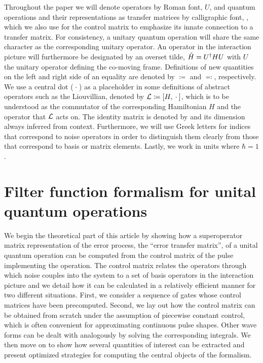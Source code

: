 Throughout the paper we will denote operators by Roman font, \eg $U$, and quantum operations and their representations as transfer matrices by calligraphic font, \eg \liouvU, which we also use for the control matrix \ctrlmat to emphasize its innate connection to a transfer matrix.
For consistency, a unitary quantum operation will share the same character as the corresponding unitary operator.
An operator in the interaction picture will furthermore be designated by an overset tilde, \eg $\tilde{H} = U^\dagger H U$ with $U$ the unitary operator defining the co-moving frame.
Definitions of new quantities on the left and right side of an equality are denoted by $\coloneqq$ and $\eqqcolon$, respectively.
We use a central dot ($\:\cdot\:$) as a placeholder in some definitions of abstract operators such as the Liouvillian, denoted by $\mc{L}\coloneqq\comm{H}{\placeholder}$, which is to be understood as the commutator of the corresponding Hamiltonian $H$ and the operator that $\mathcal{L}$ acts on.
The identity matrix is denoted by \eye and its dimension always inferred from context.
Furthermore, we will use Greek letters for indices that correspond to noise operators in order to distinguish them clearly from those that correspond to basis or matrix elements.
Lastly, we work in units where $\hbar =  1$.

\chapter{Filter function formalism for unital quantum operations}\label{ch:ff:theory}
We begin the theoretical part of this article by showing how a superoperator matrix representation of the error process, the \enquote{error transfer matrix}, of a unital quantum operation can be computed from the control matrix of the pulse implementing the operation.
The control matrix relates the operators through which noise couples into the system to a set of basis operators in the interaction picture and we detail how it can be calculated in a relatively efficient manner for two different situations.
First, we consider a sequence of gates whose control matrices have been precomputed.
Second, we lay out how the control matrix can be obtained from scratch under the assumption of piecewise constant control, which is often convenient for approximating continuous pulse shapes.
Other wave forms can be dealt with analogously by solving the corresponding integrals.
We then move on to show how several quantities of interest can be extracted and present optimized strategies for computing the central objects of the formalism.

